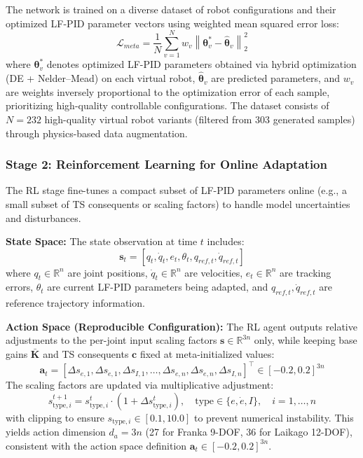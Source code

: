 \documentclass[a4paper]{cas-sc}
\begin{document}
The network is trained on a diverse dataset of robot configurations and their optimized LF-PID parameter vectors using weighted mean squared error loss:
\begin{equation}
    \mathcal{L}_{meta} = \frac{1}{N}\sum_{v=1}^{N} w_v \left\|\bm{\theta}_v^* - \hat{\bm{\theta}}_v\right\|_2^2
\end{equation}
where $\bm{\theta}_v^*$ denotes optimized LF-PID parameters obtained via hybrid optimization (DE + Nelder--Mead) on each virtual robot, $\hat{\bm{\theta}}_v$ are predicted parameters, and $w_v$ are weights inversely proportional to the optimization error of each sample, prioritizing high-quality controllable configurations. The dataset consists of $N=232$ high-quality virtual robot variants (filtered from 303 generated samples) through physics-based data augmentation.

\subsubsection{Stage 2: Reinforcement Learning for Online Adaptation}

The RL stage fine-tunes a compact subset of LF-PID parameters online (e.g., a small subset of TS consequents or scaling factors) to handle model uncertainties and disturbances.

\textbf{State Space:} The state observation at time $t$ includes:
\begin{equation}
    \mathbf{s}_t = [q_t, \dot{q}_t, e_t, \theta_t, q_{ref,t}, \dot{q}_{ref,t}]
\end{equation}
where $q_t \in \mathbb{R}^n$ are joint positions, $\dot{q}_t \in \mathbb{R}^n$ are velocities, $e_t \in \mathbb{R}^n$ are tracking errors, $\theta_t$ are current LF-PID parameters being adapted, and $q_{ref,t}, \dot{q}_{ref,t}$ are reference trajectory information.

                        \textbf{Action Space (Reproducible Configuration):} The RL agent outputs relative adjustments to the per-joint input scaling factors $\bm{s} \in \mathbb{R}^{3n}$ only, while keeping base gains $\bar{\bm{K}}$ and TS consequents $\bm{c}$ fixed at meta-initialized values:
\begin{equation}
    \mathbf{a}_t = [\Delta s_{e,1}, \Delta s_{\dot e,1}, \Delta s_{I,1}, \ldots, \Delta s_{e,n}, \Delta s_{\dot e,n}, \Delta s_{I,n}]^\top \in [-0.2, 0.2]^{3n}
\end{equation}
The scaling factors are updated via multiplicative adjustment:
\begin{equation}
    s_{\text{type},i}^{t+1} = s_{\text{type},i}^{t} \cdot (1 + \Delta s_{\text{type},i}^t), \quad \text{type} \in \{e, \dot e, I\}, \quad i=1,\ldots,n
\end{equation}
with clipping to ensure $s_{\text{type},i} \in [0.1, 10.0]$ to prevent numerical instability. This yields action dimension $d_a = 3n$ (27 for Franka 9-DOF, 36 for Laikago 12-DOF), consistent with the action space definition $\mathbf{a}_t \in [-0.2, 0.2]^{3n}$.
\end{document}
